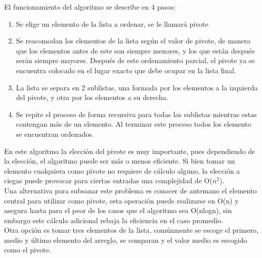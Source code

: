     El funcionamiento del algoritmo se describe en 4 pasos:\\
    \begin{enumerate}
        \item Se elige un elemento de la lista a ordenar, se le llamará pivote
        \item Se reacomodan los elementos de la lista según el valor de pivote, de manera que los elementos antes de este son siempre menores, y los que están después serán siempre mayores. Después de este ordenamiento parcial, el pivote ya se encuentra colocado en el lugar exacto que debe ocupar en la lista final.
        \item La lista se separa en 2 sublistas, una formada por los elementos a la izquierda del pivote, y otra por los elementos a su derecha.
        \item Se repite el proceso de forma recursiva para todas las sublistas mientras estas contengan más de un elemento. Al terminar este proceso todos los elemento se encuentran ordenados.
    \end{enumerate}
    
    En este algoritmo la elección del pivote es muy importante, pues dependiendo de la elección, el algoritmo puede ser más o menos eficiente. Si bien tomar un elemento cualquiera como pivote no requiere de cálculo alguno, la elección a ciegas puede provocar para ciertas entradas una complejidad de O($n^2$).\\
    
    Una alternativa para subsanar este problema es conocer de antemano el elemento central para utilizar como pivote, esta operación puede realizarse en O(n) y asegura hasta para el peor de los casos que el algoritmo sea O(nlogn), sin embargo este cálculo adicional rebaja la eficiencia en el caso promedio.\\
    
    Otra opción es tomar tres elementos de la lista, comúnmente se escoge el primero, medio y último elemento del arreglo, se comparan y el valor medio es escogido como el pivote.